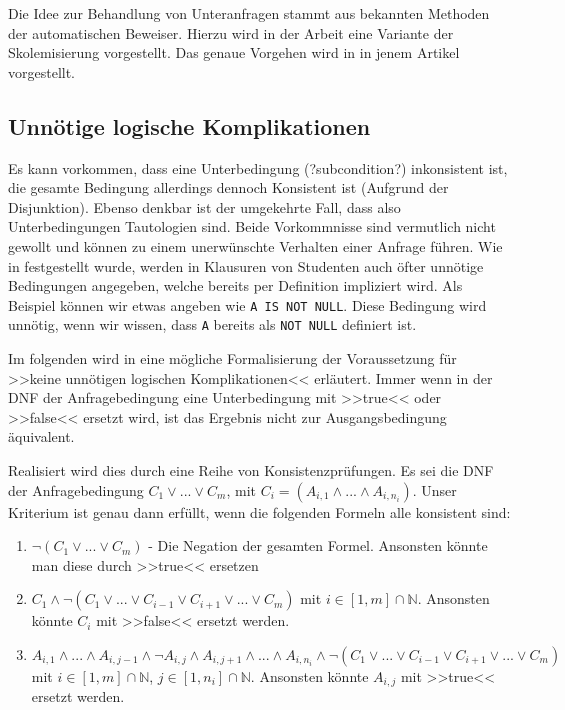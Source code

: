 Die Idee zur Behandlung von Unteranfragen stammt aus bekannten Methoden der automatischen Beweiser. Hierzu wird in der Arbeit \cite{brass1} eine Variante der Skolemisierung vorgestellt. Das genaue Vorgehen wird in in jenem Artikel vorgestellt.

\subsection{Unnötige logische Komplikationen}

Es kann vorkommen, dass eine Unterbedingung  (?subcondition?) inkonsistent ist, die gesamte Bedingung allerdings dennoch Konsistent ist (Aufgrund der Disjunktion). Ebenso denkbar ist der umgekehrte Fall, dass also Unterbedingungen Tautologien sind. Beide Vorkommnisse sind vermutlich nicht gewollt und können zu einem unerwünschte Verhalten einer Anfrage führen. Wie in \cite{brass2} festgestellt wurde, werden in Klausuren von Studenten auch öfter unnötige Bedingungen angegeben, welche bereits per Definition impliziert wird. Als Beispiel können wir etwas angeben wie \verb|A IS NOT NULL|. Diese Bedingung wird unnötig, wenn wir wissen, dass \verb|A| bereits als \verb|NOT NULL| definiert ist.

Im folgenden wird in \cite{brass2} eine mögliche Formalisierung der Voraussetzung für >>keine unnötigen logischen Komplikationen<< erläutert. Immer wenn in der DNF der Anfragebedingung eine Unterbedingung mit >>true<< oder >>false<< ersetzt wird, ist das Ergebnis nicht zur Ausgangsbedingung äquivalent.

Realisiert wird dies durch eine Reihe von Konsistenzprüfungen. Es sei die DNF der Anfragebedingung $C_1\vee ...\vee C_m$, mit $C_i=(A_{i,1}\wedge ...\wedge A_{i,n_i})$. Unser Kriterium ist genau dann erfüllt, wenn die folgenden Formeln alle konsistent sind:

\begin{enumerate}
\item $\neg(C_1 \vee ... \vee C_m)$ - Die Negation der gesamten Formel. Ansonsten könnte man diese durch >>true<< ersetzen
\item $C_1 \wedge \neg(C_1 \vee ... \vee C_{i-1} \vee C_{i+1} \vee ... \vee C_m)$ mit $i\in [1,m]\cap \mathbb{N}$. Ansonsten könnte $C_i$ mit >>false<< ersetzt werden.
\item  $A_{i,1} \wedge ... \wedge A_{i,j-1} \wedge  \neg A_{i,j} \wedge A_{i,j+1} \wedge ... \wedge A_{i,n_i} \wedge \neg(C_1 \vee ... \vee C_{i-1} \vee C_{i+1} \vee ... \vee C_m)$ mit $i\in [1,m] \cap \mathbb{N}$, $j\in [1,n_i]\cap \mathbb{N}$. Ansonsten könnte $A_{i,j}$ mit >>true<< ersetzt werden.
\end{enumerate}

